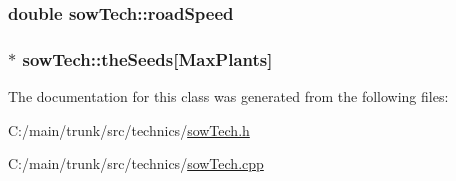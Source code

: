 \label{classsow_tech_a37a4ac51de9da38135ebbe406671eddd}
\hypertarget{classsow_tech_a20f695d310362d3df05a4dc9762b07cc}{
\subsubsection[{roadSpeed}]{\setlength{\rightskip}{0pt plus 5cm}double {\bf sowTech::roadSpeed}}}
\label{classsow_tech_a20f695d310362d3df05a4dc9762b07cc}
\hypertarget{classsow_tech_a12a77b69512097cce7ae2f0b520c7281}{
\subsubsection[{theSeeds}]{$\ast$ {\bf sowTech::theSeeds}\mbox{[}MaxPlants\mbox{]}}}
\label{classsow_tech_a12a77b69512097cce7ae2f0b520c7281}


The documentation for this class was generated from the following files:\begin{DoxyCompactItemize}
\item 
C:/main/trunk/src/technics/\hyperlink{sow_tech_8h}{sowTech.h}\item 
C:/main/trunk/src/technics/\hyperlink{sow_tech_8cpp}{sowTech.cpp}\end{DoxyCompactItemize}
